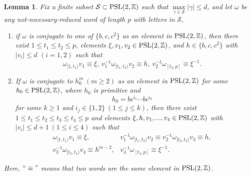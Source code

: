 \documentclass{amsart}
\theoremstyle{plain}
\newtheorem{lemma}[theorem]{Lemma}
\theoremstyle{definition}
\theoremstyle{remark}
\begin{document}
    \begin{lemma}\label{l-decom}
        Fix a finite subset $\mathcal{S}\subset\textnormal{PSL}(2,\mathbb{Z})$ such that $\max\limits_{\gamma\in\mathcal{S}}|\gamma|\leq d$, and let $\omega$ be any not-necessary-reduced word of length $p$ with letters in $\mathcal{S}$, 
        \begin{enumerate}
            \item if $\omega$ is conjugate to one of $\{b,c,c^2\}$ as an element in $\textnormal{PSL}(2,\mathbb{Z})$, then there exist $1\leq t_1\leq t_2\leq p$,  elements $\xi,v_1,v_2\in\textnormal{PSL}(2,\mathbb{Z})$, and $h\in\{b,c,c^2\}$ with $|v_i|\leq d$ $(i=1,2)$ such that
            $$\omega_{[1,t_1)}v_1\equiv \xi,\ v_1^{-1}\omega_{[t_1,t_2)}v_2\equiv h,\ v_2^{-1}\omega_{[t_2,p]}\equiv \xi^{-1}.$$
            \item If $\omega$ is conjugate to $h_0^m\ (m\geq 2)$ as an element in $\textnormal{PSL}(2,\mathbb{Z})$ for some $h_0\in\textnormal{PSL}(2,\mathbb{Z})$, where $h_0$ is primitive and 
            $$h_0=bc^{i_1}\cdots bc^{i_k}$$
            for some $k\geq 1$ and $i_j\in\{1,2\}\ (1\leq j\leq k)$,
            then there exist $1\leq t_1\leq t_2\leq t_3\leq t_4\leq p$ and elements $\xi,h,v_1,...,v_4\in\textnormal{PSL}(2,\mathbb{Z})$ with $|v_i|\leq d+1\ (1\leq i\leq 4)$ such that
            $$\begin{matrix}
             \omega_{[1,t_1)}v_1\equiv \xi,& v_1^{-1}\omega_{[t_1,t_2)}v_2\equiv v_2^{-1}\omega_{[t_2,t_3)}v_3\equiv h,\\
                v_3^{-1}\omega_{[t_3,t_4)}v_4\equiv h^{m-2},& v_4^{-1}\omega_{[t_4,p]}\equiv \xi^{-1}.
            \end{matrix}$$
        \end{enumerate}
        Here, $``\equiv"$ means that two words are the same element in $\textnormal{PSL}(2,\mathbb{Z})$.
    \end{lemma}
\end{document}
